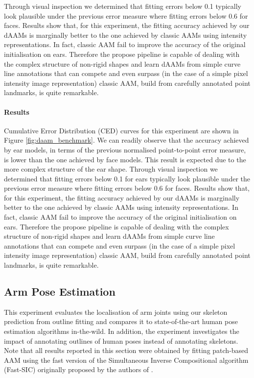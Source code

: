 Through visual inspection we determined that fitting errors below 0.1 typically look plausible under the previous error measure where fitting errors below 0.6 for faces. Results show that, for this experiment, the fitting accuracy achieved by our dAAMs is marginally better to the one achieved by classic AAMs using intensity representations. In fact, classic AAM fail to improve the accuracy of the original initialisation on ears. Therefore the propose pipeline is capable of dealing with the complex structure of non-rigid shapes and learn dAAMs from simple curve line annotations that can compete and even surpass (in the case of a simple pixel intensity image representation) classic AAM, build from carefully annotated point landmarks, is quite remarkable.


\paragraph{Results} Cumulative Error Distribution (CED) curves for this experiment are shown in Figure \ref{fig:daam_benchmark}. We can readily observe that the accuracy achieved by ear models, in terms of the previous normalised point-to-point error measure, is lower than the one achieved by face models. This result is expected due to the more complex structure of the ear shape. Through visual inspection we determined that fitting errors below 0.1 for ears typically look plausible under the previous error measure where fitting errors below 0.6 for faces. Results show that, for this experiment, the fitting accuracy achieved by our dAAMs is marginally better to the one achieved by classic AAMs using intensity representations. In fact, classic AAM fail to improve the accuracy of the original initialisation on ears. Therefore the propose pipeline is capable of dealing with the complex structure of non-rigid shapes and learn dAAMs from simple curve line annotations that can compete and even surpass (in the case of a simple pixel intensity image representation) classic AAM, build from carefully annotated point landmarks, is quite remarkable.


\subsection{Arm Pose Estimation}
\label{exp:benchmark}


This experiment evaluates the localisation of arm joints using our skeleton prediction from outline fitting and compares it to state-of-the-art human pose estimation algorithms in-the-wild.
In addition, the experiment investigates the impact of annotating outlines of human poses instead of annotating skeletons. Note that all results reported in this section were obtained by fitting patch-based AAM using the fast version of the Simultaneous Inverse Compositional algorithm (Fast-SIC) originally proposed by the authors of \cite{Papandreou2008}.



